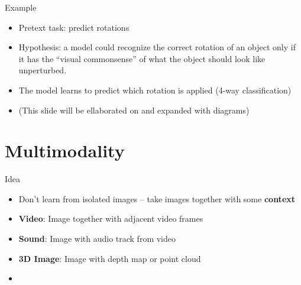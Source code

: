 \documentclass[serif, aspectratio=169]{beamer}
\begin{document}
\begin{frame}{Example}
      \begin{itemize}
 \item Pretext task: predict rotations
\item  Hypothesis: a model could recognize the correct rotation of an object 
only if it has the “visual commonsense” of what the object should look 
like unperturbed.
\item The model learns to 
predict which rotation 
is applied (4-way 
classification)
\item (This slide will be ellaborated on and expanded with diagrams)

  \end{itemize}
\end{frame}

\section{Multimodality}


\begin{frame}{Idea}
     
 \begin{itemize}
 \item  Don’t learn from isolated images -- take images together with some \textbf{context}
\item \textbf{Video}: Image together with adjacent video frames
 \item \textbf{Sound}: Image with audio track from video
 \item \textbf{3D Image}: Image with depth map or point cloud
\item  {}

  \end{itemize}
\end{frame}
\end{document}
